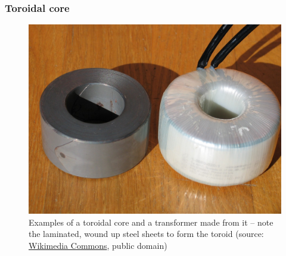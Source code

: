 \begin{frame}
	\frametitle{Toroidal core}
	\begin{figure}
		\includegraphics[height=0.7\textheight]{fig/lec04/Laminated_core_and_toroidal_transformer.jpg}
		\caption{Examples of a toroidal core and a  transformer made from it -- note the laminated, wound up steel sheets to form the toroid (source: \href{https://commons.wikimedia.org/wiki/File:Kern_und_Ringkerntrafo_100VA.JPG}{Wikimedia Commons}, public domain)}
		\label{fig:Laminated_core_and_toroidal_transformer}
	\end{figure}
\end{frame}

